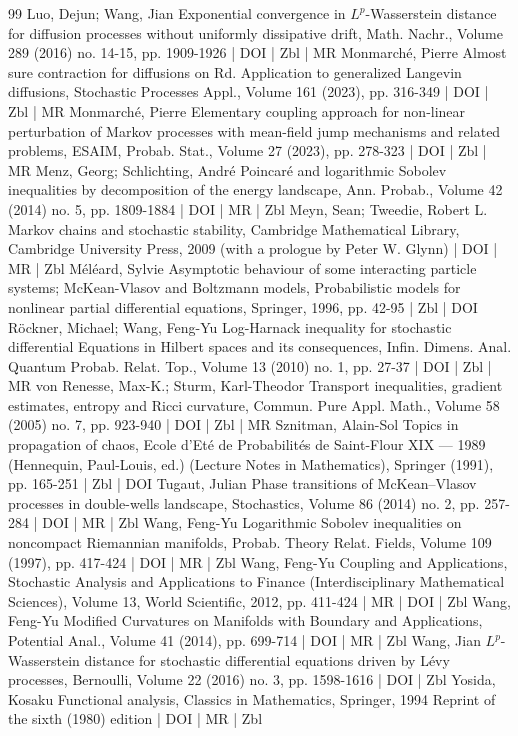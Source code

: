 \begin{thebibliography}{99}
 Luo, Dejun; Wang, Jian Exponential convergence in ${L}^p$-Wasserstein distance for diffusion processes without uniformly dissipative drift, Math. Nachr., Volume 289 (2016) no. 14-15, pp. 1909-1926 | DOI | Zbl | MR
 Monmarché, Pierre Almost sure contraction for diffusions on Rd. Application to generalized Langevin diffusions, Stochastic Processes Appl., Volume 161 (2023), pp. 316-349 | DOI | Zbl | MR
 Monmarché, Pierre Elementary coupling approach for non-linear perturbation of Markov processes with mean-field jump mechanisms and related problems, ESAIM, Probab. Stat., Volume 27 (2023), pp. 278-323 | DOI | Zbl | MR
 Menz, Georg; Schlichting, André Poincaré and logarithmic Sobolev inequalities by decomposition of the energy landscape, Ann. Probab., Volume 42 (2014) no. 5, pp. 1809-1884 | DOI | MR | Zbl
 Meyn, Sean; Tweedie, Robert L. Markov chains and stochastic stability, Cambridge Mathematical Library, Cambridge University Press, 2009 (with a prologue by Peter W. Glynn) | DOI | MR | Zbl
 Méléard, Sylvie Asymptotic behaviour of some interacting particle systems; McKean-Vlasov and Boltzmann models, Probabilistic models for nonlinear partial differential equations, Springer, 1996, pp. 42-95 | Zbl | DOI
 Röckner, Michael; Wang, Feng-Yu Log-Harnack inequality for stochastic differential Equations in Hilbert spaces and its consequences, Infin. Dimens. Anal. Quantum Probab. Relat. Top., Volume 13 (2010) no. 1, pp. 27-37 | DOI | Zbl | MR
 von Renesse, Max-K.; Sturm, Karl-Theodor Transport inequalities, gradient estimates, entropy and Ricci curvature, Commun. Pure Appl. Math., Volume 58 (2005) no. 7, pp. 923-940 | DOI | Zbl | MR
 Sznitman, Alain-Sol Topics in propagation of chaos, Ecole d’Eté de Probabilités de Saint-Flour XIX — 1989 (Hennequin, Paul-Louis, ed.) (Lecture Notes in Mathematics), Springer (1991), pp. 165-251 | Zbl | DOI
 Tugaut, Julian Phase transitions of McKean–Vlasov processes in double-wells landscape, Stochastics, Volume 86 (2014) no. 2, pp. 257-284 | DOI | MR | Zbl
 Wang, Feng-Yu Logarithmic Sobolev inequalities on noncompact Riemannian manifolds, Probab. Theory Relat. Fields, Volume 109 (1997), pp. 417-424 | DOI | MR | Zbl
 Wang, Feng-Yu Coupling and Applications, Stochastic Analysis and Applications to Finance (Interdisciplinary Mathematical Sciences), Volume 13, World Scientific, 2012, pp. 411-424 | MR | DOI | Zbl
 Wang, Feng-Yu Modified Curvatures on Manifolds with Boundary and Applications, Potential Anal., Volume 41 (2014), pp. 699-714 | DOI | MR | Zbl
 Wang, Jian ${L}^p$-Wasserstein distance for stochastic differential equations driven by Lévy processes, Bernoulli, Volume 22 (2016) no. 3, pp. 1598-1616 | DOI | Zbl
 Yosida, Kosaku Functional analysis, Classics in Mathematics, Springer, 1994 Reprint of the sixth (1980) edition | DOI | MR | Zbl
\end{thebibliography}

